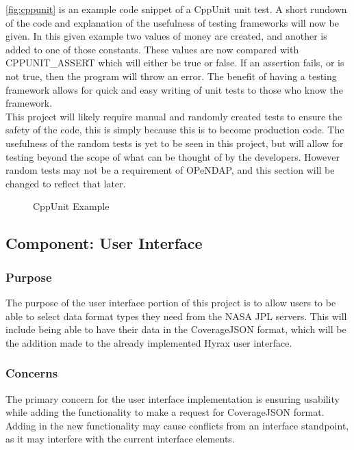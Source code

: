 \documentclass[onecolumn, draftclsnofoot,10pt, compsoc]{IEEEtran}
\begin{document}
\autoref{fig:cppunit} is an example code snippet of a CppUnit unit test. A short rundown of the code and explanation of the usefulness of testing frameworks will now be given. In this given example two values of money are created, and another is added to one of those constants. These values are now compared with CPPUNIT\_ASSERT which will either be true or false. If an assertion fails, or is not true, then the program will throw an error. The benefit of having a testing framework allows for quick and easy writing of unit tests to those who know the framework. \\This project will likely require manual and randomly created tests to ensure the safety of the code, this is simply because this is to become production code. The usefulness of the random tests is yet to be seen in this project, but will allow for testing beyond the scope of what can be thought of by the developers. However random tests may not be a requirement of OPeNDAP, and this section will be changed to reflect that later.   

\begin{figure}[h]
    \centering
	
    \caption{CppUnit Example}
    \label{fig:cppunit}
\end{figure}

\subsection{Component: User Interface}
\subsubsection{Purpose}
The purpose of the user interface portion of this project is to allow users to be able to select data format types they need from the NASA JPL servers. This will include being able to have their data in the CoverageJSON format, which will be the addition made to the already implemented Hyrax user interface. 

\subsubsection{Concerns}
The primary concern for the user interface implementation is ensuring usability while adding the functionality to make a request for CoverageJSON format. Adding in the new functionality may cause conflicts from an interface standpoint, as it may interfere with the current interface elements.
\end{document}
